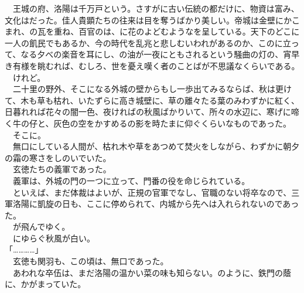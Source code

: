 \documentclass[
  paper=a5,
  fontsize=10pt,
  jafontsize=9.5pt,
  tate,                  %
  open_bracket_pos=nibu, %
]{jlreq}
\begin{document}
　王城の府、洛陽は千万戸という。さすがに古い伝統の都だけに、物資は富み、文化はだった。佳人貴顕たちの往来は目を奪うばかり美しい。帝城は金壁にかこまれ、の瓦を重ね、百官のは、に花のよどむようなを呈している。天下のどこに一人の飢民でもあるか、今の時代を乱兆と悲しむいわれがあるのか、このに立って、なる夕べの楽音を耳にし、の油が一夜にともされるという騒曲の灯の、宵早き有様を眺むれば、むしろ、世を憂え嘆く者のことばが不思議なくらいである。\\


　けれど。\\


　二十里の野外、そこになる外城の壁からもし一歩出てみるならば、秋は更けて、木も草も枯れ、いたずらに高き城壁に、草の離々たる葉のみわずかに紅く、日暮れれば花々の闇一色、夜ければの秋風ばかりいて、所々の水辺に、寒げに啼く牛の仔と、灰色の空をかすめるの影を時たまに仰ぐくらいなものであった。\\


　そこに。\\


　無口にしている人間が、枯れ木や草をあつめて焚火をしながら、わずかに朝夕の霜の寒さをしのいでいた。\\


　玄徳たちの義軍であった。\\


　義軍は、外城の門の一つに立って、門番の役を命じられている。\\


　といえば、まだ体裁はよいが、正規の官軍でなし、官職のない将卒なので、三軍洛陽に凱旋の日も、ここに停められて、内城から先へは入れられないのであった。\\


　が飛んでゆく。\\


　にゆらぐ秋風が白い。\\


「…………」\\


　玄徳も関羽も、この頃は、無口であった。\\


　あわれな卒伍は、まだ洛陽の温かい菜の味も知らない。のように、鉄門の蔭に、かがまっていた。\\
\end{document}

